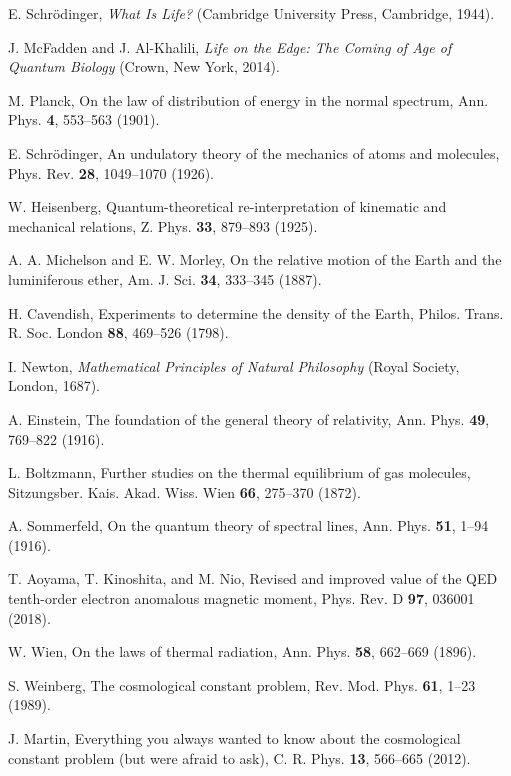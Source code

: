 \documentclass[twocolumn,aps,prl]{revtex4-2}
\begin{document}
\begin{thebibliography}{99}
		 E. Schrödinger, \textit{What Is Life?} (Cambridge University Press, Cambridge, 1944).
		
		 J. McFadden and J. Al-Khalili, \textit{Life on the Edge: The Coming of Age of Quantum Biology} (Crown, New York, 2014).
		
		 M. Planck, On the law of distribution of energy in the normal spectrum, Ann. Phys. \textbf{4}, 553--563 (1901).
		
		 E. Schrödinger, An undulatory theory of the mechanics of atoms and molecules, Phys. Rev. \textbf{28}, 1049--1070 (1926).
		
		 W. Heisenberg, Quantum-theoretical re-interpretation of kinematic and mechanical relations, Z. Phys. \textbf{33}, 879--893 (1925).
		
		 A. A. Michelson and E. W. Morley, On the relative motion of the Earth and the luminiferous ether, Am. J. Sci. \textbf{34}, 333--345 (1887).
		
		 H. Cavendish, Experiments to determine the density of the Earth, Philos. Trans. R. Soc. London \textbf{88}, 469--526 (1798).
		
		 I. Newton, \textit{Mathematical Principles of Natural Philosophy} (Royal Society, London, 1687).
		
		 A. Einstein, The foundation of the general theory of relativity, Ann. Phys. \textbf{49}, 769--822 (1916).
		
		 L. Boltzmann, Further studies on the thermal equilibrium of gas molecules, Sitzungsber. Kais. Akad. Wiss. Wien \textbf{66}, 275--370 (1872).
		
		 A. Sommerfeld, On the quantum theory of spectral lines, Ann. Phys. \textbf{51}, 1--94 (1916).
		
		 T. Aoyama, T. Kinoshita, and M. Nio, Revised and improved value of the QED tenth-order electron anomalous magnetic moment, Phys. Rev. D \textbf{97}, 036001 (2018).
		
		 W. Wien, On the laws of thermal radiation, Ann. Phys. \textbf{58}, 662--669 (1896).
		
		 S. Weinberg, The cosmological constant problem, Rev. Mod. Phys. \textbf{61}, 1--23 (1989).
		
		 J. Martin, Everything you always wanted to know about the cosmological constant problem (but were afraid to ask), C. R. Phys. \textbf{13}, 566--665 (2012).
		

\end{thebibliography}
\end{document}
